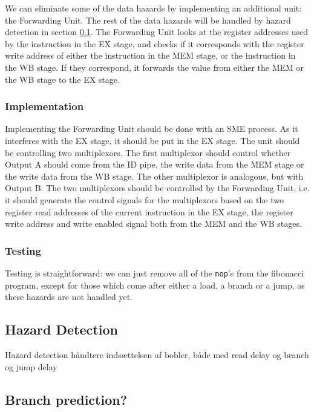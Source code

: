 We can eliminate some of the data hazards by implementing an additional unit:
the Forwarding Unit. The rest of the data hazards will be handled by hazard
detection in section \ref{sec:haz}. The Forwarding Unit looks at the register
addresses used by the instruction in the EX stage, and checks if it corresponds
with the register write address of either the instruction in the MEM stage, or
the instruction in the WB stage. If they correspond, it forwards the value from
either the MEM or the WB stage to the EX stage.

\subsubsection*{Implementation}
Implementing the Forwarding Unit should be done with an SME process. As it
interferes with the EX stage, it should be put in the EX stage. The unit should
be controlling two multiplexors. The first multiplexor should control whether
Output A should come from the ID pipe, the write data from the MEM stage or the
write data from the WB stage. The other multiplexor is analogous, but with
Output B. The two multiplexors should be controlled by the Forwarding Unit,
i.e. it should generate the control signals for the multiplexors based on the
two register read addresses of the current instruction in the EX stage, the
register write address and write enabled signal both from the MEM and the WB
stages.

\subsubsection*{Testing}
Testing is straightforward: we can just remove all of the \texttt{nop}'s from
the fibonacci program, except for those which come after either a load, a
branch or a jump, as these hazards are not handled yet.

\subsection{Hazard Detection}\label{sec:haz}
Hazard detection håndtere indsættelsen af bobler, både med read delay og branch
og jump delay

\subsection{Branch prediction?}
